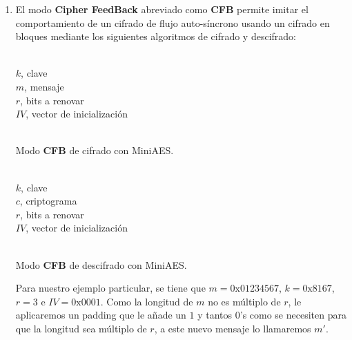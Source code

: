 \begin{enumerate}
		\item El modo \textbf{Cipher FeedBack} abreviado como \textbf{CFB} permite imitar el comportamiento de
		un cifrado de flujo auto-síncrono usando un cifrado en bloques mediante los siguientes algoritmos de
		cifrado y descifrado:
		\begin{algorithm}[H]
			\begin{algorithmic}[1]
				\REQUIRE \ \\
					\texttt{$k$}, clave\\
					\texttt{$m$}, mensaje\\
					\texttt{$r$}, bits a renovar\\
					\texttt{$IV$}, vector de inicialización\\ \
				\ENDFOR
			\end{algorithmic}
			\caption{Modo \textbf{CFB} de cifrado con MiniAES.}
			\label{EncCFB}
		\end{algorithm}
		\begin{algorithm}[H]
			\begin{algorithmic}[1]
				\REQUIRE \ \\
					\texttt{$k$}, clave\\
					\texttt{$c$}, criptograma\\
					\texttt{$r$}, bits a renovar\\
					\texttt{$IV$}, vector de inicialización\\ \
				\STATE{\texttt{$x = IV$}}
				\ENDFOR
			\end{algorithmic}
			\caption{Modo \textbf{CFB} de descifrado con MiniAES.}
			\label{DecCFB}
		\end{algorithm}
		
		Para nuestro ejemplo particular, se tiene que $m = \mathrm{0x01234567}$, $k = \mathrm{0x8167}$,
		$r = 3$ e $IV = \mathrm{0x0001}$. Como la longitud de $m$ no es múltiplo de $r$, le aplicaremos un
		padding que le añade un $1$ y tantos $0$'s como se necesiten para que la longitud sea múltiplo de
		$r$, a este nuevo mensaje lo llamaremos $m'$.
		

\end{enumerate}
